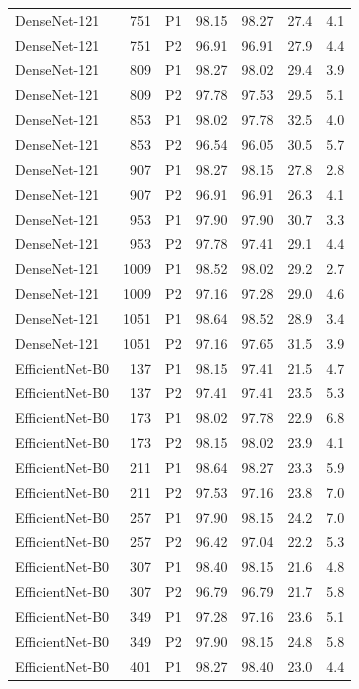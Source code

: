 {\begin{longtable}{lrlrrrr}
DenseNet-121 & 751 & P1 & 98.15 & 98.27 & 27.4 & 4.1 \\
DenseNet-121 & 751 & P2 & 96.91 & 96.91 & 27.9 & 4.4 \\
DenseNet-121 & 809 & P1 & 98.27 & 98.02 & 29.4 & 3.9 \\
DenseNet-121 & 809 & P2 & 97.78 & 97.53 & 29.5 & 5.1 \\
DenseNet-121 & 853 & P1 & 98.02 & 97.78 & 32.5 & 4.0 \\
DenseNet-121 & 853 & P2 & 96.54 & 96.05 & 30.5 & 5.7 \\
DenseNet-121 & 907 & P1 & 98.27 & 98.15 & 27.8 & 2.8 \\
DenseNet-121 & 907 & P2 & 96.91 & 96.91 & 26.3 & 4.1 \\
DenseNet-121 & 953 & P1 & 97.90 & 97.90 & 30.7 & 3.3 \\
DenseNet-121 & 953 & P2 & 97.78 & 97.41 & 29.1 & 4.4 \\
DenseNet-121 & 1009 & P1 & 98.52 & 98.02 & 29.2 & 2.7 \\
DenseNet-121 & 1009 & P2 & 97.16 & 97.28 & 29.0 & 4.6 \\
DenseNet-121 & 1051 & P1 & 98.64 & 98.52 & 28.9 & 3.4 \\
DenseNet-121 & 1051 & P2 & 97.16 & 97.65 & 31.5 & 3.9 \\
EfficientNet-B0 & 137 & P1 & 98.15 & 97.41 & 21.5 & 4.7 \\
EfficientNet-B0 & 137 & P2 & 97.41 & 97.41 & 23.5 & 5.3 \\
EfficientNet-B0 & 173 & P1 & 98.02 & 97.78 & 22.9 & 6.8 \\
EfficientNet-B0 & 173 & P2 & 98.15 & 98.02 & 23.9 & 4.1 \\
EfficientNet-B0 & 211 & P1 & 98.64 & 98.27 & 23.3 & 5.9 \\
EfficientNet-B0 & 211 & P2 & 97.53 & 97.16 & 23.8 & 7.0 \\
EfficientNet-B0 & 257 & P1 & 97.90 & 98.15 & 24.2 & 7.0 \\
EfficientNet-B0 & 257 & P2 & 96.42 & 97.04 & 22.2 & 5.3 \\
EfficientNet-B0 & 307 & P1 & 98.40 & 98.15 & 21.6 & 4.8 \\
EfficientNet-B0 & 307 & P2 & 96.79 & 96.79 & 21.7 & 5.8 \\
EfficientNet-B0 & 349 & P1 & 97.28 & 97.16 & 23.6 & 5.1 \\
EfficientNet-B0 & 349 & P2 & 97.90 & 98.15 & 24.8 & 5.8 \\
EfficientNet-B0 & 401 & P1 & 98.27 & 98.40 & 23.0 & 4.4 \\

\end{longtable}}
